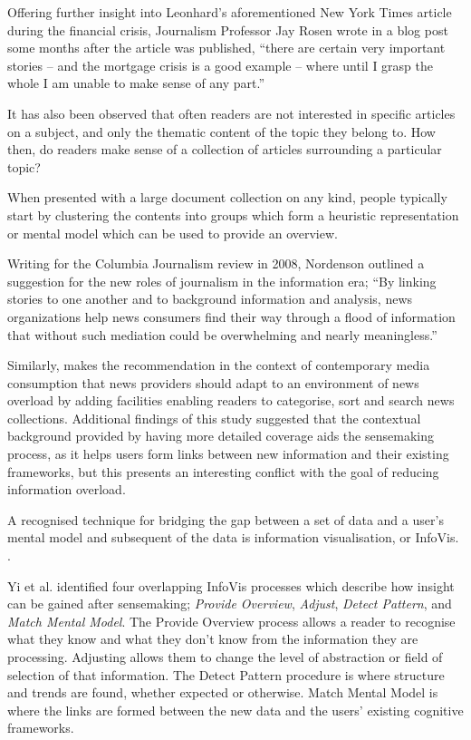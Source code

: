 Offering further insight into Leonhard's aforementioned New York Times article during the financial crisis, Journalism Professor Jay Rosen wrote in a blog post some months after the article was published, ``there are certain very important stories -- and the mortgage crisis is a good example -- where until I grasp the whole I am unable to make sense of any part.''\citep{NationalExplainer} 

It has also been observed that often readers are not interested in specific articles on a subject, and only the thematic content of the topic they belong to.\citep{AnalysingUserAccessToAnOnlineNewspaper} How then, do readers make sense of a collection of articles surrounding a particular topic?

When presented with a large document collection on any kind, people typically start by clustering the contents into groups which form a heuristic representation or mental model which can be used to provide an overview. \citep{BeingLiteratreWithLargeDocumentCollections}

Writing for the Columbia Journalism review in 2008, Nordenson outlined a suggestion for the new roles of journalism in the information era; ``By linking stories to one another and to background information and analysis, news organizations help news consumers find their way through a flood of information that without such mediation could be overwhelming and nearly meaningless.''\citep[p.10]{overloadjournalismsbattle} 

Similarly, \citep{FromInformationToKnowing} makes the recommendation in the context of contemporary media consumption that news providers should adapt to an environment of news overload by adding facilities enabling readers to categorise, sort and search news collections. Additional findings of this study suggested that the contextual background provided by having more detailed coverage aids the sensemaking process, as it helps users form links between new information and their existing frameworks, but this presents an interesting conflict with the goal of reducing information overload.

A recognised technique for bridging the gap between a set of data and a user's mental model and subsequent of the data is information visualisation, or InfoVis. \citep{UnderstandingAndCharacterizingInsights, ThemeRiver}.

Yi et al. \citep{UnderstandingAndCharacterizingInsights} identified four overlapping InfoVis processes which describe how insight can be gained after sensemaking; \textit{Provide Overview}, \textit{Adjust}, \textit{Detect Pattern}, and \textit{Match Mental Model}. The Provide Overview process allows a reader to recognise what they know and what they don't know from the information they are processing. Adjusting allows them to change the level of abstraction or field of selection of that information. The Detect Pattern procedure is where structure and trends are found, whether expected or otherwise. Match Mental Model is where the links are formed between the new data and the users' existing cognitive frameworks.

